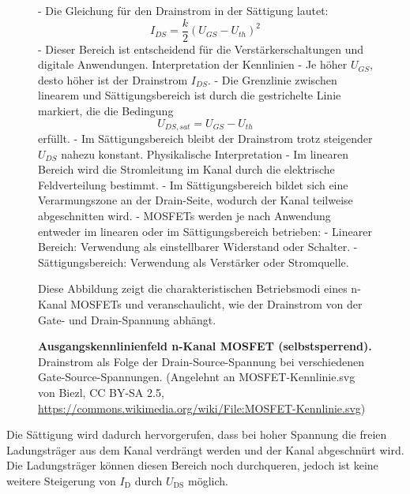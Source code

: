 {\begin{figure}[H]
{            - Die Gleichung für den Drainstrom in der Sättigung lautet:
            \[
                I_{DS} = \frac{k}{2} (U_{GS} - U_{th})^2
            \]
            - Dieser Bereich ist entscheidend für die Verstärkerschaltungen und digitale Anwendungen.
            Interpretation der Kennlinien
            - Je höher \( U_{GS} \), desto höher ist der Drainstrom \( I_{DS} \).
            - Die Grenzlinie zwischen linearem und Sättigungsbereich ist durch die gestrichelte Linie markiert, die die Bedingung
            \[
                U_{DS, sat} = U_{GS} - U_{th}
            \]
            erfüllt.
            - Im Sättigungsbereich bleibt der Drainstrom trotz steigender \( U_{DS} \) nahezu konstant.
            Physikalische Interpretation
            - Im linearen Bereich wird die Stromleitung im Kanal durch die elektrische Feldverteilung bestimmt.
            - Im Sättigungsbereich bildet sich eine Verarmungszone an der Drain-Seite, wodurch der Kanal teilweise abgeschnitten wird.
            - MOSFETs werden je nach Anwendung entweder im linearen oder im Sättigungsbereich betrieben:
            - Linearer Bereich: Verwendung als einstellbarer Widerstand oder Schalter.
            - Sättigungsbereich: Verwendung als Verstärker oder Stromquelle.

            Diese Abbildung zeigt die charakteristischen Betriebsmodi eines n-Kanal MOSFETs und veranschaulicht, wie der Drainstrom von der Gate- und Drain-Spannung abhängt.}
        \caption{\textbf{Ausgangskennlinienfeld n-Kanal MOSFET (selbstsperrend).} Drainstrom als Folge der Drain-Source-Spannung bei verschiedenen Gate-Source-Spannungen. {\tiny(Angelehnt an MOSFET-Kennlinie.svg von Biezl, CC BY-SA 2.5, \url{https://commons.wikimedia.org/wiki/File:MOSFET-Kennlinie.svg})}}
        \label{fig:AusgangskennlinienfeldN-KanalMOSFET}
    \end{figure}


    Die Sättigung wird dadurch hervorgerufen, dass bei hoher Spannung die freien Ladungsträger aus dem
    Kanal verdrängt werden und der Kanal abgeschnürt wird. Die Ladungsträger können diesen Bereich
    noch durchqueren, jedoch ist keine weitere Steigerung von $I_\mathrm{D}$ durch $U_\mathrm{DS}$ möglich.

}
